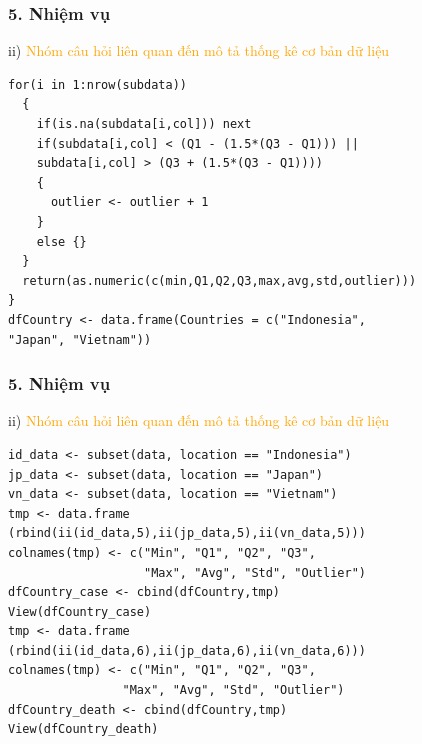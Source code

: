 \documentclass[english,10pt,table]{beamer}
\begin{document}
\begin{frame}[fragile]
\frametitle{5.  Nhiệm vụ}
	ii) \textcolor{orange}{Nhóm câu hỏi liên quan đến mô tả thống kê cơ bản dữ liệu}\\
  \begin{lstlisting}[frame=single,basicstyle=\tiny]
  for(i in 1:nrow(subdata))
  {
    if(is.na(subdata[i,col])) next
    if(subdata[i,col] < (Q1 - (1.5*(Q3 - Q1))) || 
    subdata[i,col] > (Q3 + (1.5*(Q3 - Q1))))
    {
      outlier <- outlier + 1
    }
    else {}
  }
  return(as.numeric(c(min,Q1,Q2,Q3,max,avg,std,outlier)))
}
dfCountry <- data.frame(Countries = c("Indonesia", 
"Japan", "Vietnam"))
	\end{lstlisting}
\end{frame}

\begin{frame}[fragile]
\frametitle{5.  Nhiệm vụ}
	ii) \textcolor{orange}{Nhóm câu hỏi liên quan đến mô tả thống kê cơ bản dữ liệu}\\
\begin{lstlisting}[frame = single,basicstyle=\tiny]
id_data <- subset(data, location == "Indonesia")
jp_data <- subset(data, location == "Japan")
vn_data <- subset(data, location == "Vietnam")
tmp <- data.frame
(rbind(ii(id_data,5),ii(jp_data,5),ii(vn_data,5)))
colnames(tmp) <- c("Min", "Q1", "Q2", "Q3",
                   "Max", "Avg", "Std", "Outlier")
dfCountry_case <- cbind(dfCountry,tmp)
View(dfCountry_case)
tmp <- data.frame
(rbind(ii(id_data,6),ii(jp_data,6),ii(vn_data,6)))
colnames(tmp) <- c("Min", "Q1", "Q2", "Q3", 
                "Max", "Avg", "Std", "Outlier")
dfCountry_death <- cbind(dfCountry,tmp)
View(dfCountry_death)
	\end{lstlisting}
\end{frame}
\end{document}
